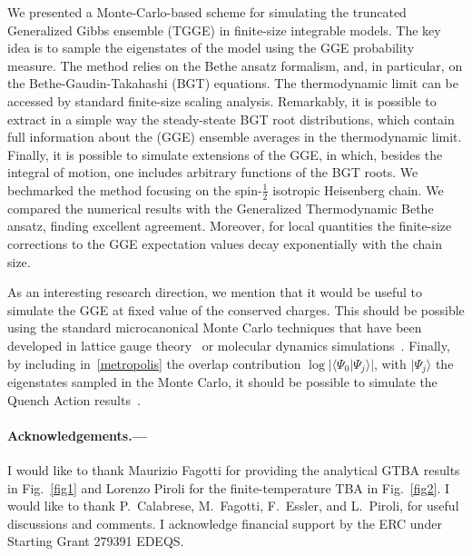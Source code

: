 \documentclass[twocolumn,superscriptaddress,prb,10pt]{revtex4-1}
\begin{document}
We presented a Monte-Carlo-based scheme for simulating the truncated Generalized 
Gibbs ensemble (TGGE) in finite-size integrable models. The key idea is to sample the 
eigenstates of the model using the GGE probability measure. The method relies on the 
Bethe ansatz formalism, and, in particular, on the Bethe-Gaudin-Takahashi (BGT) equations. 
The thermodynamic limit can be accessed by standard finite-size scaling analysis. 
Remarkably, it is possible to extract in a simple way the steady-steate BGT root 
distributions, which contain full information about the (GGE) ensemble averages 
in the thermodynamic limit. Finally, it is possible to simulate extensions of 
the GGE, in which, besides the integral of motion, one includes arbitrary functions 
of the BGT roots. 
We bechmarked the method focusing on the spin-$\frac{1}{2}$ isotropic Heisenberg chain. 
We compared the numerical results with the Generalized Thermodynamic Bethe ansatz, 
finding excellent agreement. Moreover, for local quantities the finite-size corrections 
to the GGE expectation values decay exponentially with the chain size. 

As an interesting research direction, we mention that it would be useful to simulate 
the GGE at fixed value of the conserved charges. This should be possible using the 
standard microcanonical Monte Carlo techniques that have been developed in lattice 
gauge theory~\cite{creutz-1983} or molecular dynamics simulations~\cite{lustig-1998}. 
Finally, by including in~\eqref{metropolis} the overlap contribution 
$\log|\langle\Psi_0|\Psi_j\rangle|$, with $|\Psi_j\rangle$ the eigenstates sampled in 
the Monte Carlo,  it should be possible to simulate the Quench Action results~\cite{prep}.

\paragraph*{Acknowledgements.---}
I would like to thank Maurizio Fagotti for providing the analytical GTBA results in 
Fig.~\ref{fig1} and Lorenzo Piroli for the finite-temperature TBA in Fig.~\ref{fig2}. 
I would like to thank P.~Calabrese, M.~Fagotti, F.~Essler, and L.~Piroli,  for useful 
discussions and comments. I acknowledge financial support by the ERC under Starting 
Grant 279391 EDEQS. 
\end{document}
